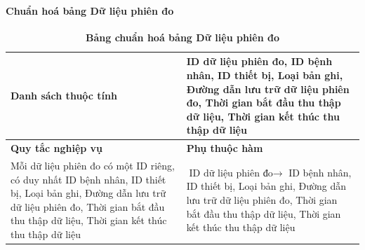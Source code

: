 \paragraph{Chuẩn hoá bảng Dữ liệu phiên đo}
\mbox{}
\begin{table}[H]
	\caption{\bfseries \fontsize{12pt}{0pt}\selectfont Bảng chuẩn hoá bảng Dữ liệu phiên đo}
	\centering
	\begin{tabularx}{0.9\textwidth}{|X|X|}
		\hline
		\textbf{Danh sách thuộc tính} & ID dữ liệu phiên đo, ID bệnh nhân, ID thiết bị, Loại bản ghi, Đường dẫn lưu trữ dữ liệu phiên đo, Thời gian bắt đầu thu thập dữ liệu, Thời gian kết thúc thu thập dữ liệu                                             \\
		\hline
		\textbf{Quy tắc nghiệp vụ}    & \textbf{Phụ thuộc hàm}                                                                                                                                                                                                \\
		\hline
		Mỗi dữ liệu phiên đo có một ID riêng, có duy nhất ID bệnh nhân, ID thiết bị, Loại bản ghi, Đường dẫn lưu trữ dữ liệu phiên đo, Thời gian bắt đầu thu thập dữ liệu, Thời gian kết thúc thu thập dữ liệu
		                              & \parbox[t]{\linewidth}{$\text{ID dữ liệu phiên đo} \rightarrow$ ID bệnh nhân, ID thiết bị, Loại bản ghi, Đường dẫn lưu trữ dữ liệu phiên đo, Thời gian bắt đầu thu thập dữ liệu, Thời gian kết thúc thu thập dữ liệu} \\
		\hline
		                                                                                                                                                                   \\
		                                                                                                                                                                             \\
		\hline
	\end{tabularx}
\end{table}

